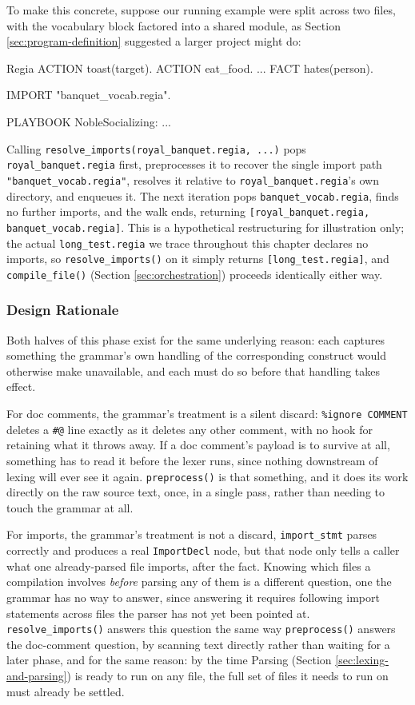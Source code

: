 To make this concrete, suppose our running example were split across two files, with the vocabulary block factored into a shared module, as Section \ref{sec:program-definition} suggested a larger project might do:
\begin{codeblock}[]{Regia}
ACTION toast(target).
ACTION eat_food.
...
FACT hates(person).

IMPORT "banquet_vocab.regia".

PLAYBOOK NobleSocializing:
    ...
\end{codeblock}
Calling \lstinline|resolve_imports(royal_banquet.regia, ...)| pops \lstinline|royal_banquet.regia| first, preprocesses it to recover the single import path \lstinline|"banquet_vocab.regia"|, resolves it relative to \lstinline|royal_banquet.regia|'s own directory, and enqueues it. The next iteration pops \lstinline|banquet_vocab.regia|, finds no further imports, and the walk ends, returning \lstinline|[royal_banquet.regia, banquet_vocab.regia]|. This is a hypothetical restructuring for illustration only; the actual \lstinline|long_test.regia| we trace throughout this chapter declares no imports, so \lstinline|resolve_imports()| on it simply returns \lstinline|[long_test.regia]|, and \lstinline|compile_file()| (Section \ref{sec:orchestration}) proceeds identically either way.

\subsubsection{Design Rationale}
Both halves of this phase exist for the same underlying reason: each captures something the grammar's own handling of the corresponding construct would otherwise make unavailable, and each must do so before that handling takes effect.

For doc comments, the grammar's treatment is a silent discard: \lstinline|%ignore COMMENT| deletes a \lstinline|#@| line exactly as it deletes any other comment, with no hook for retaining what it throws away. If a doc comment's payload is to survive at all, something has to read it before the lexer runs, since nothing downstream of lexing will ever see it again. \lstinline|preprocess()| is that something, and it does its work directly on the raw source text, once, in a single pass, rather than needing to touch the grammar at all.

For imports, the grammar's treatment is not a discard, \lstinline|import_stmt| parses correctly and produces a real \lstinline|ImportDecl| node, but that node only tells a caller what one already-parsed file imports, after the fact. Knowing which files a compilation involves \emph{before} parsing any of them is a different question, one the grammar has no way to answer, since answering it requires following import statements across files the parser has not yet been pointed at. \lstinline|resolve_imports()| answers this question the same way \lstinline|preprocess()| answers the doc-comment question, by scanning text directly rather than waiting for a later phase, and for the same reason: by the time Parsing (Section \ref{sec:lexing-and-parsing}) is ready to run on any file, the full set of files it needs to run on must already be settled.

